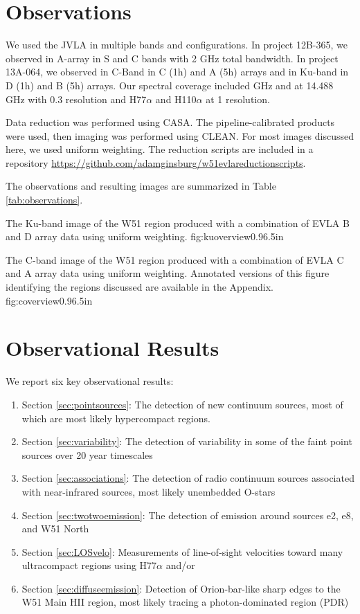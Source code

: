 \section{Observations}
We used the JVLA in multiple bands and configurations.  In project 12B-365, we
observed in A-array in S and C bands with 2 GHz total bandwidth.  In project
13A-064, we observed in C-Band in C (1h) and A (5h) arrays and in Ku-band in D
(1h) and B (5h) arrays.  Our spectral coverage included \ortho {} GHz
and \twotwo at 14.488 GHz with 0.3 \kms resolution and H77$\alpha$ and H110$\alpha$
at 1 \kms resolution.

Data reduction was performed using CASA.  The pipeline-calibrated products were
used, then imaging was performed using CLEAN.  For most images discussed here, we
used uniform weighting.  The reduction scripts are included in a repository
\url{https://github.com/adamginsburg/w51evlareductionscripts}.

The observations and resulting images are summarized in Table
\ref{tab:observations}.




{The Ku-band image of the W51 region produced with a combination of
EVLA B and D array data using uniform weighting.}
{fig:kuoverview}{0.9}{6.5in}

{The C-band image of the W51 region produced with a combination of EVLA
C and A array data using uniform weighting.  Annotated versions of this figure
identifying the regions discussed are available in the Appendix.}
{fig:coverview}{0.9}{6.5in}

\section{Observational Results}
We report six key observational results: 
\begin{enumerate}
    \item Section \ref{sec:pointsources}: The detection of new continuum
        sources, most of which are most likely hypercompact \hii regions. 
    \item Section \ref{sec:variability}: The detection of variability in
        some of the faint point sources over 20 year timescales
    \item Section \ref{sec:associations}: The detection of radio continuum
        sources associated with near-infrared sources, most likely unembedded
        O-stars
    \item Section \ref{sec:twotwoemission}: The detection of \formaldehyde
        \twotwo emission around sources e2, e8, and W51 North
    \item Section \ref{sec:LOSvelo}: Measurements of line-of-sight velocities
        toward many ultracompact \hii regions using H77$\alpha$ and/or
        \formaldehyde
    \item Section \ref{sec:diffuseemission}: Detection of Orion-bar-like sharp
        edges to the W51 Main HII region, most likely tracing a
        photon-dominated region (PDR)
\end{enumerate}

